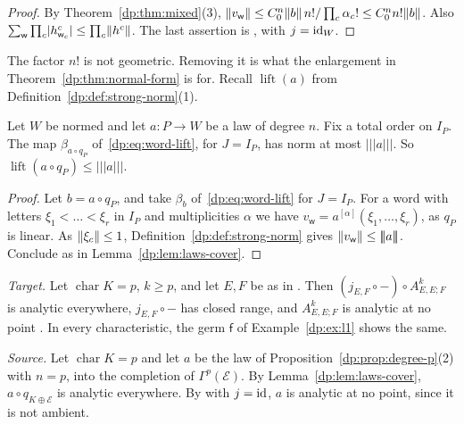 \begin{proof}
By Theorem~\ref{dp:thm:mixed}(3), $\lVert v_{\mathsf w}\rVert\le C_0^n\lVert b\rVert\,n!/\prod_c\alpha_c!\le C_0^nn!\lVert b\rVert$. Also $\sum_{\mathsf w}\prod_c\lvert h^c_{\mathsf w_c}\rvert\le\prod_c\lVert h^c\rVert$. The last assertion is \cite[Proposition~2.5]{I}, with $j=\mathrm{id}_W$.
\end{proof}

The factor $n!$ is not geometric. Removing it is what the enlargement in Theorem~\ref{dp:thm:normal-form} is for. Recall $\operatorname{lift}(a)$ from Definition~\ref{dp:def:strong-norm}(1).

\begin{lemma}\label{dp:lem:lift-cover}
Let $W$ be normed and let $a\colon P\to W$ be a law of degree $n$. Fix a total order on $I_P$. The map $\beta_{a\circ q_P}$ of~\eqref{dp:eq:word-lift}, for $J=I_P$, has norm at most $\lvert\!\lvert\!\lvert a\rvert\!\rvert\!\rvert$. So $\operatorname{lift}(a\circ q_P)\le\lvert\!\lvert\!\lvert a\rvert\!\rvert\!\rvert$.
\end{lemma}

\begin{proof}
Let $b=a\circ q_P$, and take $\beta_b$ of~\eqref{dp:eq:word-lift} for $J=I_P$. For a word with letters $\xi_1<\dots<\xi_r$ in $I_P$ and multiplicities $\alpha$ we have $v_{\mathsf w}=a^{[\alpha]}(\xi_1,\dots,\xi_r)$, as $q_P$ is linear. As $\lVert \xi_c\rVert\le1$, Definition~\ref{dp:def:strong-norm} gives $\lVert v_{\mathsf w}\rVert\le\lvert\!\lvert\!\lvert a\rvert\!\rvert\!\rvert$. Conclude as in Lemma~\ref{dp:lem:laws-cover}.
\end{proof}

\begin{remark}\label{dp:rem:an-no-descent}
\emph{Target.} Let $\operatorname{char}K=p$, $k\ge p$, and let $E,F$ be as in \cite[Theorem~7.2(1)]{I}. Then $(j_{E,F}\circ{-})\circ A^k_{E,E;F}$ is analytic everywhere, $j_{E,F}\circ{-}$ has closed range, and $A^k_{E,E;F}$ is analytic at no point \cite[Remark~14.13]{I}. In every characteristic, the germ $\mathsf f$ of Example~\ref{dp:ex:l1} shows the same.

\emph{Source.} Let $\operatorname{char}K=p$ and let $a$ be the law of Proposition~\ref{dp:prop:degree-p}(2) with $n=p$, into the completion of $\Gamma^p(\mathcal E)$. By Lemma~\ref{dp:lem:laws-cover}, $a\circ q_{K\oplus\mathcal E}$ is analytic everywhere. By \cite[Proposition~14.9(2)]{I} with $j=\mathrm{id}$, $a$ is analytic at no point, since it is not ambient.
\end{remark}

